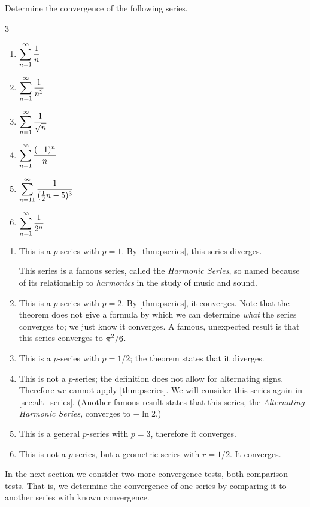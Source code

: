 \begin{example}\label{ex_series6}%
Determine the convergence of the following series.
\begin{multicols}{3}
\begin{enumerate}
\item		$\displaystyle\sum_{n=1}^\infty \frac{1}{n}$
\item		$\displaystyle\sum_{n=1}^\infty \frac{1}{n^2}$
\item		$\displaystyle\sum_{n=1}^\infty \frac{1}{\sqrt{n}}$
\item		$\displaystyle\sum_{n=1}^\infty \frac{(-1)^n}{n}$
\item		$\displaystyle\sum_{n=11}^\infty \frac{1}{(\frac12n-5)^3}$
\item		$\displaystyle\sum_{n=1}^\infty \frac{1}{2^n}$
\end{enumerate}
\end{multicols}
\solution
\begin{enumerate}
\item	This is a $p$-series with $p=1$. By \autoref{thm:pseries}, this series diverges.

This series is a famous series, called the \emph{Harmonic Series}, so named because of its relationship to \emph{harmonics} in the study of music and sound. 

\item	This is a $p$-series with $p=2$. By \autoref{thm:pseries}, it converges. Note that the theorem does not give a formula by which we can determine \emph{what} the series converges to; we just know it converges. A famous, unexpected result is that this series converges to $\displaystyle{\pi^2}/{6}$.

\item	This is a $p$-series with $p=1/2$; the theorem states that it diverges.

\item	This is not a $p$-series; the definition does not allow for alternating signs. Therefore we cannot apply \autoref{thm:pseries}. We will consider this series again in \autoref{sec:alt_series}.
(Another famous result states that this series, the \emph{Alternating Harmonic Series}, converges to $-\ln 2$.)

\item	This is a general $p$-series with $p=3$, therefore it converges.

\item	This is not a $p$-series, but a geometric series with $r=1/2$. It converges.
\end{enumerate}
\end{example}

In the next section we consider two more convergence tests, both comparison tests. That is, we determine the convergence of one series by  comparing it to another series with known convergence. 

